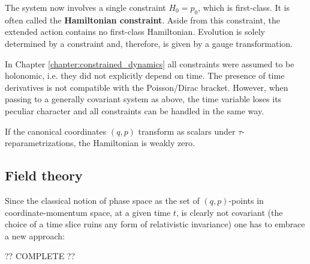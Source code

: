     The system now involves a single constraint $H_0=p_0$, which is first-class. It is often called the \textbf{Hamiltonian constraint}. Aside from this constraint, the extended action contains no first-class Hamiltonian. Evolution is solely determined by a constraint and, therefore, is given by a gauge transformation.

    \begin{remark}
        In Chapter \ref{chapter:constrained_dynamics} all constraints were assumed to be holonomic, i.e. they did not explicitly depend on time. The presence of time derivatives is not compatible with the Poisson/Dirac bracket. However, when passing to a generally covariant system as above, the time variable loses its peculiar character and all constraints can be handled in the same way.
    \end{remark}

    \begin{property}
        If the canonical coordinates $(q,p)$ transform as scalars under $\tau$-reparametrizations, the Hamiltonian is weakly zero.
    \end{property}

\subsection{Field theory}

    Since the classical notion of phase space as the set of $(q,p)$-points in coordinate-momentum space, at a given time $t$, is clearly not covariant (the choice of a time slice ruins any form of relativistic invariance) one has to embrace a new approach:

    ?? COMPLETE ??